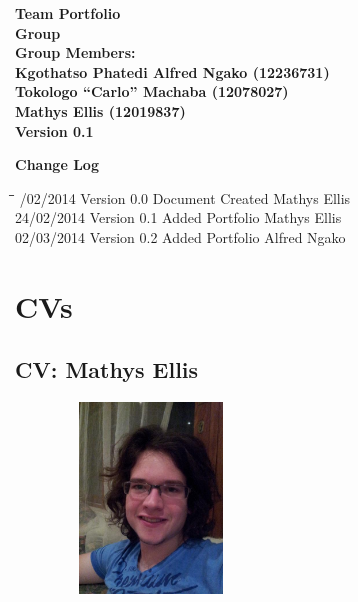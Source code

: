 \documentclass[12pt]{article}
\newcommand{\Title}{Team Portfolio} %
\begin{document}
	\begin{center}%
	
	  \LARGE \bf \Title \\[4em]
	  \LARGE {\bf Group }\\[1em]
	  \LARGE {\bf Group Members:}\\[2em]
	  \large
	      Kgothatso Phatedi Alfred Ngako	(12236731) \\[1em]
	   	  Tokologo “Carlo” Machaba			(12078027) \\[1em]
	   	  Mathys Ellis						(12019837) \\[8em]
	   	  {\bf Version 0.1}	    
	\end{center}%
	
	\newpage
	{\LARGE \bf Change Log}\\[2em]	
		\begin{tabbing}
			\hspace*{3cm}\=\hspace*{3cm}\=\hspace*{8cm}\=\hspace*{3cm} /02/2014 \> Version 0.0 \> Document Created \> Mathys Ellis\\ 
			24/02/2014 \> Version 0.1 \> Added Portfolio \> Mathys Ellis\\
			02/03/2014 \> Version 0.2 \> Added Portfolio \> Alfred Ngako\\
		\end{tabbing}
			
	\newpage
		\tableofcontents
			
	\newpage
	\section{CVs}
	
	\newpage
	\subsection{CV: Mathys Ellis}
	
	\begin{figure}[ht!]
		\centering
		\includegraphics[width=2in, height=2in]{./Pictures/MathysEllis.jpg}
	\end{figure}
		
\end{document}
